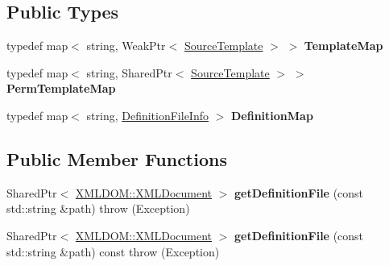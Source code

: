 \subsection*{Public Types}
\begin{DoxyCompactItemize}
\item 
typedef map$<$ string, Weak\+Ptr$<$ \hyperlink{classAudio_1_1SourceTemplate}{Source\+Template} $>$ $>$ {\bfseries Template\+Map}\hypertarget{structAudio_1_1____impl_1_1TemplateManagerData_a427e67c6728b9b2bfdd5d22b7375f5ee}{}\label{structAudio_1_1____impl_1_1TemplateManagerData_a427e67c6728b9b2bfdd5d22b7375f5ee}

\item 
typedef map$<$ string, Shared\+Ptr$<$ \hyperlink{classAudio_1_1SourceTemplate}{Source\+Template} $>$ $>$ {\bfseries Perm\+Template\+Map}\hypertarget{structAudio_1_1____impl_1_1TemplateManagerData_a05d0cf1d843bbc4a47be997f8a417f70}{}\label{structAudio_1_1____impl_1_1TemplateManagerData_a05d0cf1d843bbc4a47be997f8a417f70}

\item 
typedef map$<$ string, \hyperlink{structAudio_1_1____impl_1_1TemplateManagerData_1_1DefinitionFileInfo}{Definition\+File\+Info} $>$ {\bfseries Definition\+Map}\hypertarget{structAudio_1_1____impl_1_1TemplateManagerData_ac93fa4bd5a86af3ef656f4ca5978a693}{}\label{structAudio_1_1____impl_1_1TemplateManagerData_ac93fa4bd5a86af3ef656f4ca5978a693}

\end{DoxyCompactItemize}
\subsection*{Public Member Functions}
\begin{DoxyCompactItemize}
\item 
Shared\+Ptr$<$ \hyperlink{classXMLDOM_1_1XMLDocument}{X\+M\+L\+D\+O\+M\+::\+X\+M\+L\+Document} $>$ {\bfseries get\+Definition\+File} (const std\+::string \&path)  throw (\+Exception)\hypertarget{structAudio_1_1____impl_1_1TemplateManagerData_ad5429c8ac92b13fac28c978c715d2c4a}{}\label{structAudio_1_1____impl_1_1TemplateManagerData_ad5429c8ac92b13fac28c978c715d2c4a}

\item 
Shared\+Ptr$<$ \hyperlink{classXMLDOM_1_1XMLDocument}{X\+M\+L\+D\+O\+M\+::\+X\+M\+L\+Document} $>$ {\bfseries get\+Definition\+File} (const std\+::string \&path) const   throw (\+Exception)\hypertarget{structAudio_1_1____impl_1_1TemplateManagerData_a1cade70a39e7007a137c968cf3efaa26}{}\label{structAudio_1_1____impl_1_1TemplateManagerData_a1cade70a39e7007a137c968cf3efaa26}

\end{DoxyCompactItemize}
